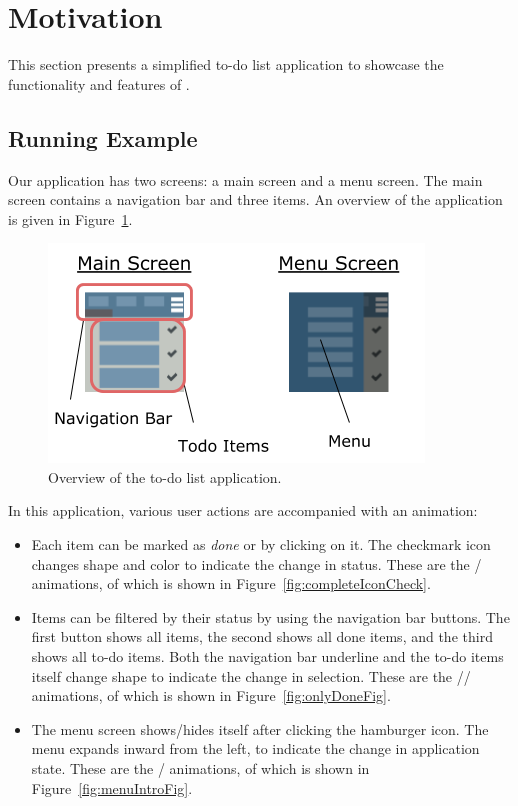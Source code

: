 \section{Motivation}
\label{sec:motivation}

This section presents a simplified to-do list application to showcase the
functionality and features of \dsl{}.

\subsection{Running Example}

Our application has two screens: a main screen and a menu screen. The main
screen contains a navigation bar and three items. An overview of the
application is given in Figure~\ref{fig:appOverview}.

\begin{figure}[!htbp]
\centering
\includegraphics[width=\figscale\textwidth]{pictures/app_overview}
\caption{Overview of the to-do list application.}
\label{fig:appOverview}
\end{figure}

In this application, various user actions are accompanied with an animation:
\begin{itemize}
\item Each item can be marked as \emph{done} or \emph{} by clicking on it. The
checkmark icon changes shape and color to indicate the change in status. These
are the / animations, of which  is
shown in Figure~\ref{fig:completeIconCheck}.
\item Items can be filtered by their status by using the navigation bar
buttons. The first button shows all items, the second shows all done items, and
the third shows all to-do items. Both the navigation bar underline and the
to-do items itself change shape to indicate the change in selection. These are
the // animations, of which
 is shown in Figure~\ref{fig:onlyDoneFig}.
\item The menu screen shows/hides itself after clicking the hamburger icon. The
menu expands inward from the left, to indicate the change in application state.
These are the / animations, of which 
is shown in Figure~\ref{fig:menuIntroFig}.
\end{itemize}

